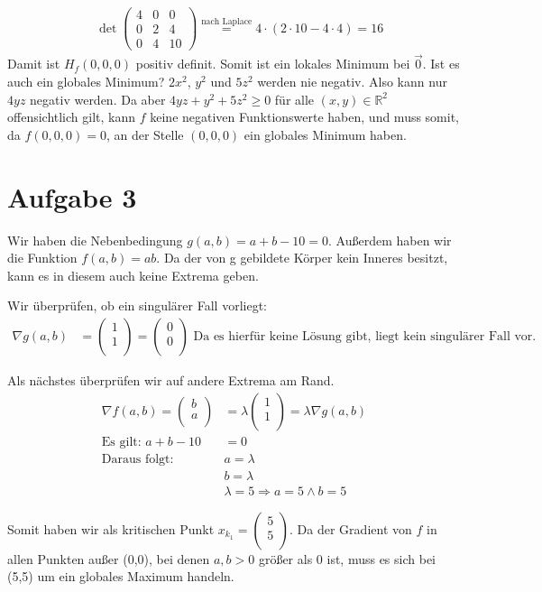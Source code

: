 \documentclass[10pt,a4paper,parskip=half]{scrartcl}
\newcommand{\vectwo}[2]{\begin{pmatrix}#1\\#2\\\end {pmatrix}}
\begin{document}
\begin{enumerate}
\begin{align*}
	 	&\det \begin{pmatrix}
	 		4 & 0 & 0 \\
			0 & 2 & 4 \\
			0 & 4 & 10
	 	\end{pmatrix} \overset{\text{nach Laplace}}{=} 4\cdot (2\cdot10 - 4\cdot4) = 16
	 \end{align*} Damit ist $H_f(0,0,0)$ positiv definit. Somit ist ein lokales Minimum bei $\vec 0$. Ist es auch ein globales Minimum? 
	$2x^2$, $y^2$ und $5z^2$ werden nie negativ. Also kann nur $4yz$ negativ werden. Da aber $4yz  + y^2 + 5z^2 \ge 0$ für alle $(x,y) \in \mathbb{R}^2$ offensichtlich gilt, kann $f$ keine negativen Funktionswerte haben,  und muss somit, da $f(0,0,0) = 0$, an der Stelle $(0,0,0)$ ein globales Minimum haben.
\end{enumerate}
\section*{Aufgabe 3}
Wir haben die Nebenbedingung $g(a,b) = a + b -10 = 0$. Außerdem haben wir die Funktion $f(a,b) = ab$. Da der von g gebildete Körper kein Inneres besitzt, kann es in diesem auch keine Extrema geben.

Wir überprüfen, ob ein singulärer Fall vorliegt: 
\begin{align*}
\nabla g(a,b) &= \vectwo{1}{1} = \vectwo{0}{0} \text{ Da es hierfür keine Lösung gibt, liegt kein singulärer Fall vor.}
\end{align*}

Als nächstes überprüfen wir auf andere Extrema am Rand.
\begin{align*}
\nabla f(a,b) = \vectwo{b}{a} &= \lambda \vectwo{1}{1} = \lambda \nabla g(a,b) \\
\text{Es gilt: } a + b - 10 &= 0 \\
\text{Daraus folgt: }& a = \lambda \\
& b = \lambda \\
& \lambda = 5 \Rightarrow a = 5 \land b = 5
\end{align*}


Somit haben wir als kritischen Punkt $x_{k_1} = \vectwo{5}{5}$.
Da der Gradient von $f$ in allen Punkten außer (0,0), bei denen $a,b > 0$ größer als 0 ist, muss es sich bei (5,5) um ein globales Maximum handeln. 
\end{document}
